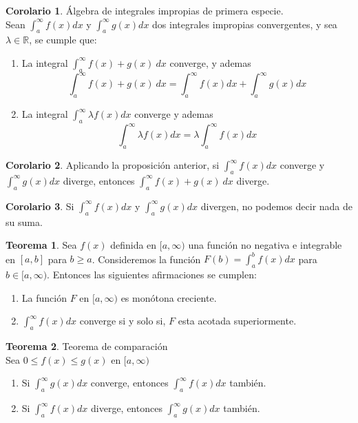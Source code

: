 \documentclass[10pt]{article}
\theoremstyle{definition}
\newtheorem{theorem}{Teorema}[section]
\newtheorem{corollary}{Corolario}[theorem]
\begin{document}
\begin{corollary}{Álgebra de integrales impropias de primera especie.}
	\\Sean $\int_{a}^{\infty} f(x) dx$ y $\int_{a}^{\infty} g(x) dx$ dos integrales impropias convergentes, y sea $\lambda\in\mathbb{R}$, se cumple que:
	\begin{enumerate}
		\item La integral $\int_{a}^{\infty} f(x)+ g(x)\ dx$ converge, y ademas $$\int_{a}^{\infty} f(x)+g(x)\ dx=\int_{a}^{\infty} f(x) dx+\int_{a}^{\infty} g(x) dx$$
		\item La integral $\int_{a}^{\infty} \lambda f(x) dx$ converge y ademas $$\int_{a}^{\infty} \lambda f(x) dx=\lambda \int_{a}^{\infty} f(x) dx$$
	\end{enumerate}
\end{corollary}
\begin{corollary}
	Aplicando la proposición anterior, si $\int_{a}^{\infty} f(x) dx$ converge y $\int_{a}^{\infty} g(x) dx$ diverge, entonces $\int_{a}^{\infty} f(x)+g(x)\ dx$ diverge.
\end{corollary}
\begin{corollary}
	Si $\int_{a}^{\infty} f(x) dx$ y $\int_{a}^{\infty} g(x) dx$ divergen, no podemos decir nada de su suma.
\end{corollary}
\begin{theorem}
	Sea $f(x)$ definida en $[a,\infty)$ una función no negativa e integrable en $[a,b]$ para $b\ge a$. Consideremos la función $F(b)=\int_{a}^{b} f(x) dx$ para $b\in [a,\infty)$. Entonces las siguientes afirmaciones se cumplen:
	\begin{enumerate}
		\item La función $F$ en $[a,\infty)$ es monótona creciente.
		\item $\int_{a}^{\infty} f(x) dx$ converge si y solo si, $F$ esta acotada superiormente.
	\end{enumerate}
\end{theorem}
\newpage\begin{theorem}{Teorema de comparación}
	\\Sea $0\le f(x)\le g(x)$ en $[a,\infty)$
	\begin{enumerate}
		\item Si $\int_{a}^{\infty} g(x) dx$ converge, entonces $\int_{a}^{\infty} f(x) dx$ también.
		\item Si $\int_{a}^{\infty} f(x) dx$ diverge, entonces $\int_{a}^{\infty} g(x) dx$ también.
	\end{enumerate}
\end{theorem}
\end{document}
